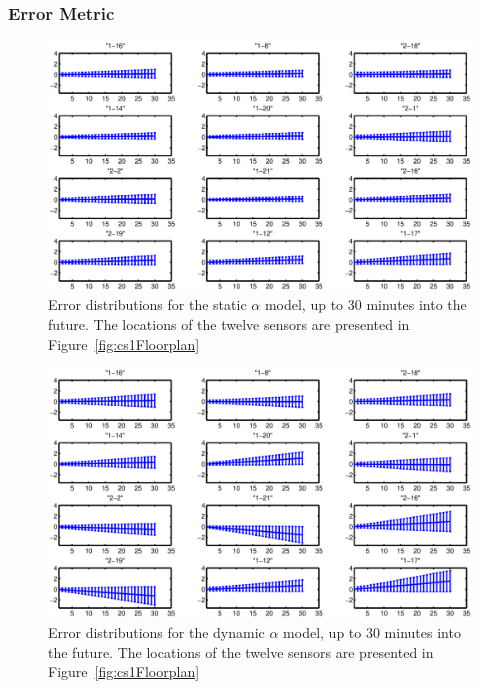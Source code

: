 \subsubsection{Error Metric}
\label{sec:errormetric}

\begin{figure}[!htb]
\begin{center}
\includegraphics[width=0.8\columnwidth]{fig/PooledSingleError.eps}
\end{center}
\caption[Error distributions for the static $\alpha$ model]{Error distributions
for the static $\alpha$ model, up to 30 minutes into the future. The locations
of the twelve sensors are presented in Figure~\ref{fig:cs1Floorplan}}
\label{fig:staticerror}
\end{figure}

\begin{figure}[!htb]
\begin{center}
\includegraphics[width=0.8\columnwidth]{fig/DynSingleError.eps}
\end{center}
\caption[Error distributions for the dynamic $\alpha$ model]{Error distributions
for the dynamic $\alpha$ model, up to 30 minutes into the future. The locations
of the twelve sensors are presented in Figure~\ref{fig:cs1Floorplan}}
\label{fig:dynamicerror}
\end{figure}

